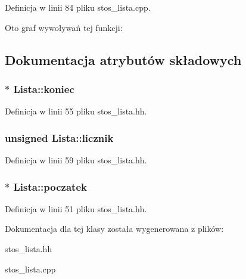 \-Definicja w linii 84 pliku stos\-\_\-lista.\-cpp.



\-Oto graf wywoływań tej funkcji\-:




\subsection{\-Dokumentacja atrybutów składowych}
\hypertarget{class_lista_a74098fc9225d008398096c33e6f2c76b}{
\subsubsection[{koniec}]{$\ast$ {\bf \-Lista\-::koniec}}}\label{class_lista_a74098fc9225d008398096c33e6f2c76b}


\-Definicja w linii 55 pliku stos\-\_\-lista.\-hh.

\hypertarget{class_lista_a3cbc0beed9a449e0fb2f66bb6bd393d3}{
\subsubsection[{licznik}]{\setlength{\rightskip}{0pt plus 5cm}unsigned {\bf \-Lista\-::licznik}}}\label{class_lista_a3cbc0beed9a449e0fb2f66bb6bd393d3}


\-Definicja w linii 59 pliku stos\-\_\-lista.\-hh.

\hypertarget{class_lista_a86a0427913a82e41da202168e209bd06}{
\subsubsection[{poczatek}]{$\ast$ {\bf \-Lista\-::poczatek}}}\label{class_lista_a86a0427913a82e41da202168e209bd06}


\-Definicja w linii 51 pliku stos\-\_\-lista.\-hh.



\-Dokumentacja dla tej klasy została wygenerowana z plików\-:\begin{DoxyCompactItemize}
\item 
stos\-\_\-lista.\-hh\item 
stos\-\_\-lista.\-cpp\end{DoxyCompactItemize}
